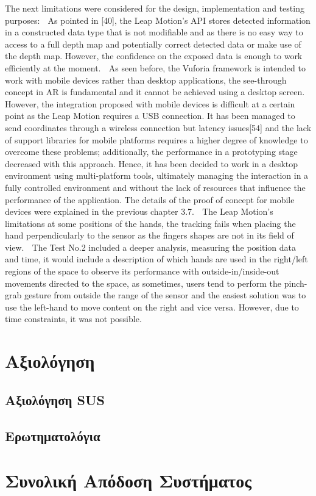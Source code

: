 The next limitations were considered for the design, implementation and testing purposes:  As pointed in [40], the Leap Motion’s API stores detected information in a constructed data type that is not modifiable and as there is no easy way to access to a full depth map and potentially correct detected data or make use of the depth map. However, the confidence on the exposed data is enough to work efficiently at the moment.  As seen before, the Vuforia framework is intended to work with mobile devices rather than desktop applications, the see-through concept in AR is fundamental and it cannot be achieved using a desktop screen. However, the integration proposed with mobile devices is difficult at a certain point as the Leap Motion requires a USB connection. It has been managed to send coordinates through a wireless connection but latency issues[54] and the lack of support libraries for mobile platforms requires a higher degree of knowledge to overcome these problems; additionally, the performance in a prototyping stage decreased with this approach. Hence, it has been decided to work in a desktop environment using multi-platform tools, ultimately managing the interaction in a fully controlled environment and without the lack of resources that influence the performance of the application. The details of the proof of concept for mobile devices were explained in the previous chapter 3.7.  The Leap Motion’s limitations at some positions of the hands, the tracking fails when placing the hand perpendicularly to the sensor as the fingers shapes are not in its field of view.  The Test No.2 included a deeper analysis, measuring the position data and time, it would include a description of which hands are used in the right/left regions of the space to observe its performance with outside-in/inside-out movements directed to the space, as sometimes, users tend to perform the pinch-grab gesture from outside the range of the sensor and the easiest solution was to use the left-hand to move content on the right and vice versa. However, due to time constraints, it was not possible.

\section{Αξιολόγηση}
\subsection{Αξιολόγηση SUS}
\subsection{Ερωτηματολόγια}

\section{Συνολική Απόδοση Συστήματος}

